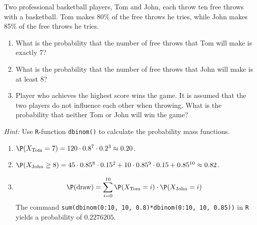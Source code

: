 
\begin{exercise}

Two professional basketball players, Tom and John, each throw ten free throws with
a basketball. Tom makes 80\% of the free throws he tries, while John makes 85\%
of the free throws he tries.

\begin{enumerate}[label = (\alph*)]
  \item What is the probability that the number of free throws that Tom will make
  is exactly 7?
  \item What is the probability that the number of free throws that John will make
  is at least 8?
  \item Player who achieves the highest score wins the game. It is assumed that
  the two players do not influence each other when throwing. What is the probability
  that neither Tom or John will win the game?
\end{enumerate}
\textit{Hint:} Use \texttt{R}-function \texttt{dbinom()} to calculate the probability
mass functions.

\end{exercise}


\begin{solution}

\phantom{}

\begin{enumerate}[label = (\alph*)]
  \item $\P(X_{\text{Tom}} = 7) = 120 \cdot 0.8^{7}\cdot0.2^{3} \approx 0.20$.
  \item $\P(X_{\text{John}} \geq 8) =
  45\cdot0.85^{8}\cdot0.15^{2} + 10\cdot 0.85^{9}\cdot 0.15 + 0.85^{10} \approx 0.82$.
  \item
  \begin{align*}
    \P(\text{draw}) = \sum_{i=0}^{10} \P(X_{\text{Tom}} = i) \cdot \P(X_{\text{John}} = i)
  \end{align*}
  The command \texttt{sum(dbinom(0:10, 10, 0.8)*dbinom(0:10, 10, 0.85))} in \texttt{R}
  yields a probability of $0.2276205$.
\end{enumerate}

\end{solution}

